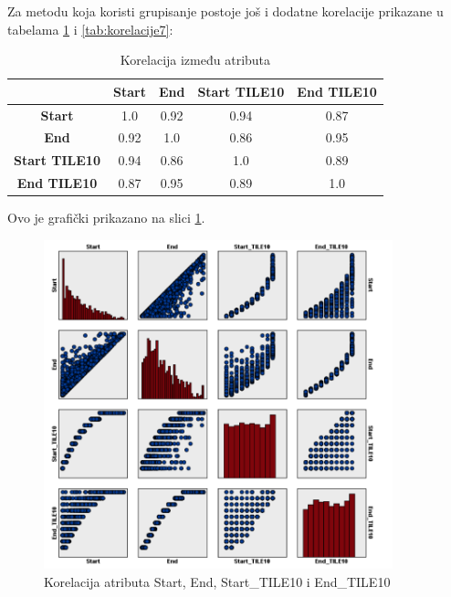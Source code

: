 \documentclass[a4paper]{article}
\begin{document}
Za metodu koja koristi grupisanje postoje još i dodatne  korelacije prikazane u tabelama \ref{tab:korelacije6} i \ref{tab:korelacije7}:

\begin{table}[ht!]
\begin{center}
\caption{Korelacija između atributa}
\label{tab:korelacije6}
\begin{tabular}{c|c|c|c|c} \hline
& \textbf{Start} & \textbf{End} & \textbf{Start TILE10} & \textbf{End TILE10}\\ \hline
\textbf{Start} & 1.0 & 0.92 & 0.94 & 0.87\\ \hline
\textbf{End} & 0.92 & 1.0 & 0.86 & 0.95\\ \hline
\textbf{Start TILE10} & 0.94 & 0.86 & 1.0 & 0.89\\ \hline
\textbf{End TILE10} & 0.87 & 0.95 & 0.89 & 1.0\\ \hline
\end{tabular}
\end{center}
\end{table}

Ovo je grafički prikazano na slici \ref{fig:korel_se}.
\begin{figure}[ht!]
                \centering
                \includegraphics[width=0.9\textwidth]{korel_se.PNG}
                \caption{Korelacija atributa Start, End, Start\_TILE10 i End\_TILE10}
                \label{fig:korel_se}
            \end{figure}
\end{document}

